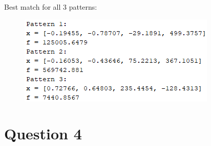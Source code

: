 \documentclass[10pt,a4paper]{article}
\begin{document}
Best match for all 3 patterns:
\begin{figure} [H]
	\centering
	\includegraphics[width=0.7\linewidth]{q3re}
\end{figure}


\newpage
\section*{Question 4}
\end{document}

